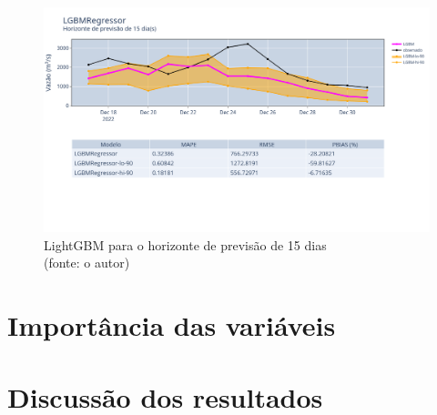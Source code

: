 \begin{figure}[!h]
	\centering
	\includegraphics[scale=0.33]{Figuras/jequiti/resultados/LGBMRegressor_fh15.png}
	\caption{LightGBM para o horizonte de previsão de 15 dias\\(fonte: o autor)}
	\label{fig:jequiti_LGBMRegressor_fh15}
\end{figure}

\clearpage

\section{Importância das variáveis}

\section{Discuss\~ao dos resultados}
